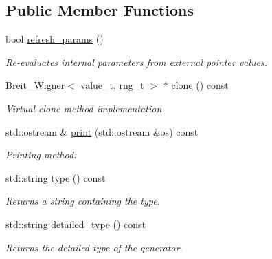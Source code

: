 \subsection*{Public Member Functions}
\begin{DoxyCompactItemize}
\item 
bool \hyperlink{a00027_a2fd9996da8a6cc37e427e7eb92328b42}{refresh\+\_\+params} ()
\begin{DoxyCompactList}\small\item\em Re-\/evaluates internal parameters from external pointer values. \end{DoxyCompactList}\item 
\hypertarget{a00027_a45f43e8a8954267185dd9462e4701611}{}\hyperlink{a00027}{Breit\+\_\+\+Wigner}$<$ value\+\_\+t, rng\+\_\+t $>$ $\ast$ \hyperlink{a00027_a45f43e8a8954267185dd9462e4701611}{clone} () const \label{a00027_a45f43e8a8954267185dd9462e4701611}

\begin{DoxyCompactList}\small\item\em Virtual clone method implementation. \end{DoxyCompactList}\item 
\hypertarget{a00027_abed71c02a9d4bce79045f035888ff65c}{}std\+::ostream \& \hyperlink{a00027_abed71c02a9d4bce79045f035888ff65c}{print} (std\+::ostream \&os) const \label{a00027_abed71c02a9d4bce79045f035888ff65c}

\begin{DoxyCompactList}\small\item\em Printing method\+: \end{DoxyCompactList}\item 
\hypertarget{a00027_a32e69343f7c42a9a481c5cc550465a32}{}std\+::string \hyperlink{a00027_a32e69343f7c42a9a481c5cc550465a32}{type} () const \label{a00027_a32e69343f7c42a9a481c5cc550465a32}

\begin{DoxyCompactList}\small\item\em Returns a string containing the type. \end{DoxyCompactList}\item 
\hypertarget{a00027_a3e5241fa6cc8f4ba35da2dee224a40f5}{}std\+::string \hyperlink{a00027_a3e5241fa6cc8f4ba35da2dee224a40f5}{detailed\+\_\+type} () const \label{a00027_a3e5241fa6cc8f4ba35da2dee224a40f5}

\begin{DoxyCompactList}\small\item\em Returns the detailed type of the generator. \end{DoxyCompactList}\end{DoxyCompactItemize}
